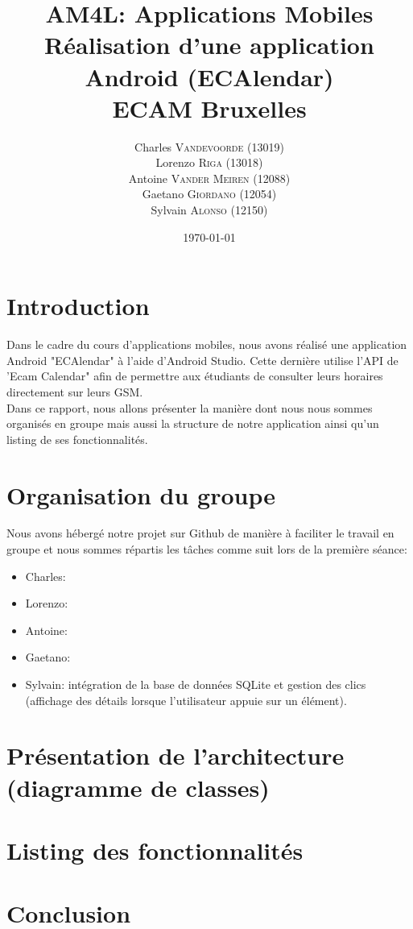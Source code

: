\documentclass{article}
\title{AM4L: Applications Mobiles \\ Réalisation d'une application Android (ECAlendar) \\ ECAM Bruxelles} %
\author{Charles \textsc{Vandevoorde} (13019)\\
		Lorenzo \textsc{Riga} (13018)\\
		Antoine \textsc{Vander Meiren} (12088)\\
		Gaetano \textsc{Giordano} (12054)\\
		Sylvain \textsc{Alonso} (12150)\\} %
\date{\today} %
\begin{document}
	
	\maketitle %
	
	
	\section*{Introduction}
	\hspace{0.45cm}
	Dans le cadre du cours d'applications mobiles, nous avons réalisé une application Android "ECAlendar" à l'aide d'Android Studio. Cette dernière utilise l'API de 'Ecam Calendar" afin de permettre aux étudiants de consulter leurs horaires directement sur leurs GSM.\\
	
	Dans ce rapport, nous allons présenter la manière dont nous nous sommes organisés en groupe mais aussi la structure de notre application ainsi qu'un listing de ses fonctionnalités. 
	
	\section{Organisation du groupe}
	\hspace{0.45cm}
	 Nous avons hébergé notre projet sur Github de manière à faciliter le travail en groupe et nous sommes répartis les tâches comme suit lors de la première séance:
	 \begin{itemize}
	 	\item Charles:
	 	\item Lorenzo:
	 	\item Antoine:
	 	\item Gaetano:
	 	\item Sylvain: intégration de la base de données SQLite et gestion des clics (affichage des détails lorsque l'utilisateur appuie sur un élément).
	 \end{itemize}
	 
	
	\section{Présentation de l'architecture (diagramme de classes)}
	\hspace{0.45cm}
	
	\section{Listing des fonctionnalités}
	\hspace{0.45cm}
	
	\section{Conclusion}
	\hspace{0.45cm}

	
	
	
	
	
\end{document}
